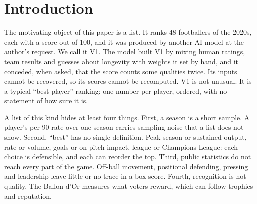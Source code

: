 \documentclass[11pt,a4paper]{article}
\begin{document}
\begin{abstract}
In simulated leagues on the real schedule, pooled RAPM ranks a planted best
player first in \RecoveryRapmFirst{} of leagues and a box-score composite in
\RecoveryBoxFirst{}. Across every mixture we ran, the highest probability of
being ranked first that any outfield player reaches is
\AllVariantsMaxPFirst{}, and the largest share of decided outfield pairwise
orderings is \AllVariantsMaxDecided{}. What is
stable is a group of attackers: \CorrectedTopFiveInRegistered{} of the
corrected first five were already among the first five of the registered
mixture by median rank. What is not stable is who is first, the order inside
the group, and the place of every player whose work the box score does not
count. A ranking of the best player of the 2020s remains a statement about
what is counted more than about the players.
\end{abstract}
\clearpage

\tableofcontents
\clearpage

\section{Introduction}
\label{sec:intro}

The motivating object of this paper is a list. It ranks 48 footballers of the
2020s, each with a score out of 100, and it was produced by another AI model
at the author's request. We call it V1. The model built V1 by mixing human
ratings, team results and guesses about longevity with weights it set by
hand, and it conceded, when asked, that the score counts some qualities twice.
Its inputs cannot be recovered, so its scores cannot be recomputed. V1 is not
unusual. It is a typical ``best player'' ranking: one number per player,
ordered, with no statement of how sure it is.

A list of this kind hides at least four things. First, a season is a short
sample. A player's per-90 rate over one season carries sampling noise that
a list does not show. Second, ``best'' has no single definition. Peak season
or sustained output, rate or volume, goals or on-pitch impact, league or
Champions League: each choice is defensible, and each can reorder the top.
Third, public statistics do not reach every part of the game. Off-ball
movement, positional defending, pressing and leadership leave little or no
trace in a box score. Fourth, recognition is not quality. The Ballon d'Or
measures what voters reward, which can follow trophies and reputation.
\end{document}
